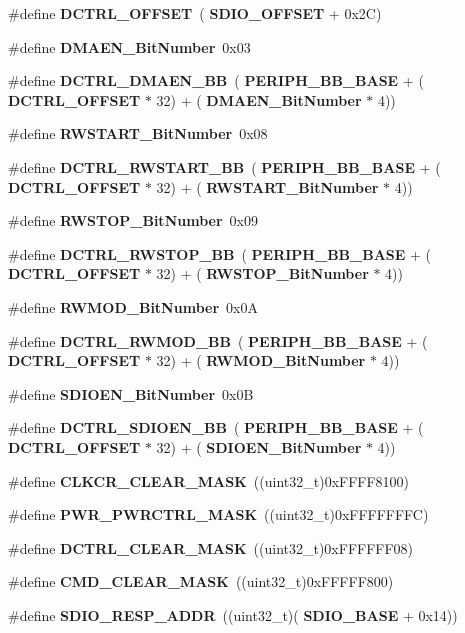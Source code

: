 \begin{DoxyCompactItemize}
\item 
\#define \textbf{ D\+C\+T\+R\+L\+\_\+\+O\+F\+F\+S\+ET}~(\textbf{ S\+D\+I\+O\+\_\+\+O\+F\+F\+S\+ET} + 0x2\+C)
\item 
\#define \textbf{ D\+M\+A\+E\+N\+\_\+\+Bit\+Number}~0x03
\item 
\#define \textbf{ D\+C\+T\+R\+L\+\_\+\+D\+M\+A\+E\+N\+\_\+\+BB}~(\textbf{ P\+E\+R\+I\+P\+H\+\_\+\+B\+B\+\_\+\+B\+A\+SE} + (\textbf{ D\+C\+T\+R\+L\+\_\+\+O\+F\+F\+S\+ET} $\ast$ 32) + (\textbf{ D\+M\+A\+E\+N\+\_\+\+Bit\+Number} $\ast$ 4))
\item 
\#define \textbf{ R\+W\+S\+T\+A\+R\+T\+\_\+\+Bit\+Number}~0x08
\item 
\#define \textbf{ D\+C\+T\+R\+L\+\_\+\+R\+W\+S\+T\+A\+R\+T\+\_\+\+BB}~(\textbf{ P\+E\+R\+I\+P\+H\+\_\+\+B\+B\+\_\+\+B\+A\+SE} + (\textbf{ D\+C\+T\+R\+L\+\_\+\+O\+F\+F\+S\+ET} $\ast$ 32) + (\textbf{ R\+W\+S\+T\+A\+R\+T\+\_\+\+Bit\+Number} $\ast$ 4))
\item 
\#define \textbf{ R\+W\+S\+T\+O\+P\+\_\+\+Bit\+Number}~0x09
\item 
\#define \textbf{ D\+C\+T\+R\+L\+\_\+\+R\+W\+S\+T\+O\+P\+\_\+\+BB}~(\textbf{ P\+E\+R\+I\+P\+H\+\_\+\+B\+B\+\_\+\+B\+A\+SE} + (\textbf{ D\+C\+T\+R\+L\+\_\+\+O\+F\+F\+S\+ET} $\ast$ 32) + (\textbf{ R\+W\+S\+T\+O\+P\+\_\+\+Bit\+Number} $\ast$ 4))
\item 
\#define \textbf{ R\+W\+M\+O\+D\+\_\+\+Bit\+Number}~0x0A
\item 
\#define \textbf{ D\+C\+T\+R\+L\+\_\+\+R\+W\+M\+O\+D\+\_\+\+BB}~(\textbf{ P\+E\+R\+I\+P\+H\+\_\+\+B\+B\+\_\+\+B\+A\+SE} + (\textbf{ D\+C\+T\+R\+L\+\_\+\+O\+F\+F\+S\+ET} $\ast$ 32) + (\textbf{ R\+W\+M\+O\+D\+\_\+\+Bit\+Number} $\ast$ 4))
\item 
\#define \textbf{ S\+D\+I\+O\+E\+N\+\_\+\+Bit\+Number}~0x0B
\item 
\#define \textbf{ D\+C\+T\+R\+L\+\_\+\+S\+D\+I\+O\+E\+N\+\_\+\+BB}~(\textbf{ P\+E\+R\+I\+P\+H\+\_\+\+B\+B\+\_\+\+B\+A\+SE} + (\textbf{ D\+C\+T\+R\+L\+\_\+\+O\+F\+F\+S\+ET} $\ast$ 32) + (\textbf{ S\+D\+I\+O\+E\+N\+\_\+\+Bit\+Number} $\ast$ 4))
\item 
\#define \textbf{ C\+L\+K\+C\+R\+\_\+\+C\+L\+E\+A\+R\+\_\+\+M\+A\+SK}~((uint32\+\_\+t)0x\+F\+F\+F\+F8100)
\item 
\#define \textbf{ P\+W\+R\+\_\+\+P\+W\+R\+C\+T\+R\+L\+\_\+\+M\+A\+SK}~((uint32\+\_\+t)0x\+F\+F\+F\+F\+F\+F\+F\+C)
\item 
\#define \textbf{ D\+C\+T\+R\+L\+\_\+\+C\+L\+E\+A\+R\+\_\+\+M\+A\+SK}~((uint32\+\_\+t)0x\+F\+F\+F\+F\+F\+F08)
\item 
\#define \textbf{ C\+M\+D\+\_\+\+C\+L\+E\+A\+R\+\_\+\+M\+A\+SK}~((uint32\+\_\+t)0x\+F\+F\+F\+F\+F800)
\item 
\#define \textbf{ S\+D\+I\+O\+\_\+\+R\+E\+S\+P\+\_\+\+A\+D\+DR}~((uint32\+\_\+t)(\textbf{ S\+D\+I\+O\+\_\+\+B\+A\+SE} + 0x14))
\end{DoxyCompactItemize}
